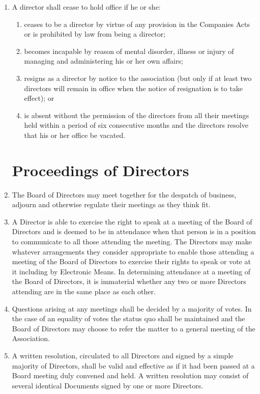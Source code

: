 \begin{enumerate}
\item\label{director-cease}
  A director shall cease to hold office if he or she:
  \begin{enumerate}
    \item
    ceases to be a director by virtue of any provision in the
    Companies Acts or is prohibited by law from being a director;
    \item
    becomes incapable by reason of mental disorder, illness
    or injury of managing and administering his or her own affairs;
    \item
    resigns as a director by notice to the association (but only if at
    least two directors will remain in office when the notice of
    resignation is to take effect); or
    \item
    is absent without the
    permission of the directors from all their meetings held within a
    period of six consecutive months and the directors resolve that his
    or her office be vacated.
  \end{enumerate}

\section{Proceedings of Directors}
\item The Board of Directors may meet together for the despatch of business,
  adjourn and otherwise regulate their meetings as they think fit.

\item A Director is able to exercise the right to speak at a meeting of the
  Board of Directors and is deemed to be in attendance when that person is in a
  position to communicate to all those attending the meeting. The Directors may
  make whatever arrangements they consider appropriate to enable those
  attending a meeting of the Board of Directors to exercise their rights to
  speak or vote at it including by Electronic Means. In determining attendance
  at a meeting of the Board of Directors, it is immaterial whether any two or
  more Directors attending are in the same place as each other.

\item Questions arising at any meetings shall be decided by a majority of
  votes. In the case of an equality of votes the status quo shall be maintained
  and the Board of Directors may choose to refer the matter to a general
  meeting of the Association.

\item A written resolution, circulated to all Directors and signed by a simple
  majority of Directors, shall be valid and effective as if it had been passed
  at a Board meeting duly convened and held. A written resolution may consist
  of several identical Documents signed by one or more Directors.


\end{enumerate}
